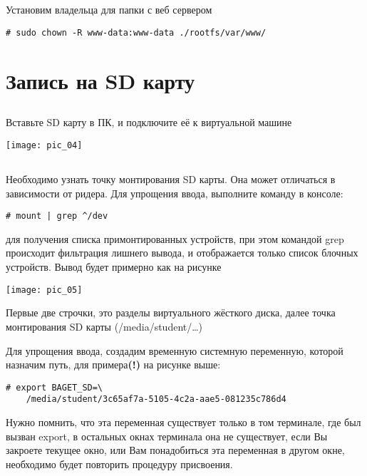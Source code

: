 \subsection{}Установим владельца для папки с веб сервером
\begin{lstlisting}[style=bash]
# sudo chown -R www-data:www-data ./rootfs/var/www/
\end{lstlisting}

\section{Запись на SD карту}

\subsection{}Вставьте SD карту в ПК, и подключите её к виртуальной машине
\begin{center}
	\texttt{[image: pic\_04]}
\end{center}

\subsection{}Необходимо узнать точку монтирования SD карты. Она может отличаться в зависимости от ридера. Для упрощения ввода, выполните команду в консоле:
\begin{lstlisting}[style=bash]
	# mount | grep ^/dev
\end{lstlisting}
для получения списка примонтированных устройств, при этом командой grep происходит фильтрация лишнего вывода, и отображается только список блочных устройств. Вывод будет примерно как на рисунке

\begin{center}
	\texttt{[image: pic\_05]}
\end{center}

Первые две строчки, это разделы виртуального жёсткого диска, далее точка монтирования SD карты (/media/student/…)

Для упрощения ввода, создадим временную системную переменную, которой назначим путь, для примера\textbf{(!)} на рисунке выше:
\begin{lstlisting}[style=bash]
	# export BAGET_SD=\
	/media/student/3c65af7a-5105-4c2a-aae5-081235c786d4
\end{lstlisting}

Нужно помнить, что эта переменная существует только в том терминале, где был вызван export, в остальных окнах терминала она не существует, если Вы закроете текущее окно, или Вам понадобиться эта переменная в другом окне, необходимо будет повторить процедуру присвоения.

